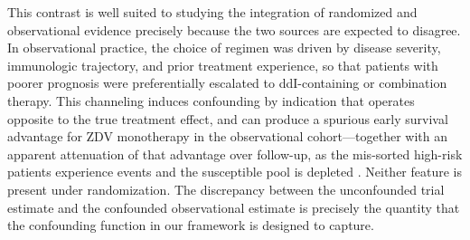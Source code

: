 \documentclass[11pt]{article}
\theoremstyle{plain}
\theoremstyle{definition}
\theoremstyle{remark}
\newcommand{\1}{\mathds{1}}
\begin{document}
This contrast is well suited to studying the integration of randomized and
observational evidence precisely because the two sources are expected to
disagree. In observational practice, the choice of regimen was driven by
disease severity, immunologic trajectory, and prior treatment experience,
so that patients with poorer prognosis were preferentially escalated to
ddI-containing or combination therapy. This channeling induces confounding
by indication that operates opposite to the true treatment effect, and can
produce a spurious early survival advantage for ZDV monotherapy in the
observational cohort---together with an apparent attenuation of that
advantage over follow-up, as the mis-sorted high-risk patients experience
events and the susceptible pool is depleted \citep{hernan2010}. Neither
feature is present under randomization. The discrepancy between the
unconfounded trial estimate and the confounded observational estimate is
precisely the quantity that the confounding function in our framework is
designed to capture.
\end{document}
